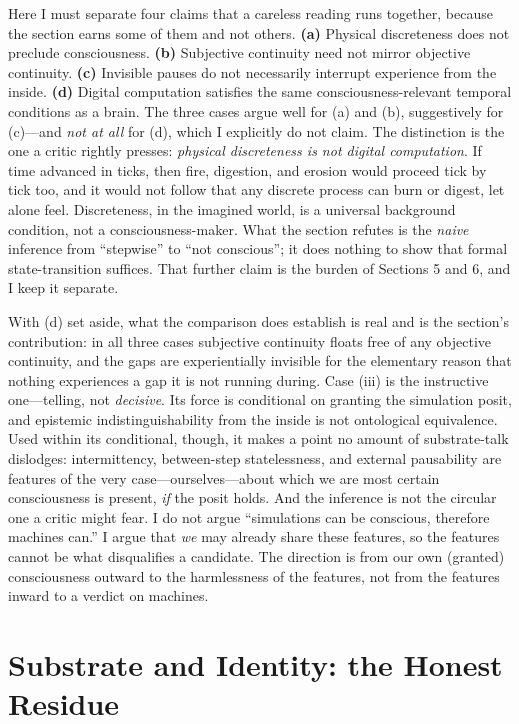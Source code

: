 \documentclass[11pt]{article}
\begin{document}
Here I must separate four claims that a careless reading runs together, because the section earns some of them and not others. \textbf{(a)} Physical discreteness does not preclude consciousness. \textbf{(b)} Subjective continuity need not mirror objective continuity. \textbf{(c)} Invisible pauses do not necessarily interrupt experience from the inside. \textbf{(d)} Digital computation satisfies the same consciousness-relevant temporal conditions as a brain. The three cases argue well for (a) and (b), suggestively for (c)---and \emph{not at all} for (d), which I explicitly do not claim. The distinction is the one a critic rightly presses: \emph{physical discreteness is not digital computation}. If time advanced in ticks, then fire, digestion, and erosion would proceed tick by tick too, and it would not follow that any discrete process can burn or digest, let alone feel. Discreteness, in the imagined world, is a universal background condition, not a consciousness-maker. What the section refutes is the \emph{naive} inference from ``stepwise'' to ``not conscious''; it does nothing to show that formal state-transition suffices. That further claim is the burden of Sections 5 and 6, and I keep it separate.

With (d) set aside, what the comparison does establish is real and is the section's contribution: in all three cases subjective continuity floats free of any objective continuity, and the gaps are experientially invisible for the elementary reason that nothing experiences a gap it is not running during. Case (iii) is the instructive one---telling, not \emph{decisive}. Its force is conditional on granting the simulation posit, and epistemic indistinguishability from the inside is not ontological equivalence. Used within its conditional, though, it makes a point no amount of substrate-talk dislodges: intermittency, between-step statelessness, and external pausability are features of the very case---ourselves---about which we are most certain consciousness is present, \emph{if} the posit holds. And the inference is not the circular one a critic might fear. I do not argue ``simulations can be conscious, therefore machines can.'' I argue that \emph{we} may already share these features, so the features cannot be what disqualifies a candidate. The direction is from our own (granted) consciousness outward to the harmlessness of the features, not from the features inward to a verdict on machines.

\section{Substrate and Identity: the Honest Residue}
\end{document}
